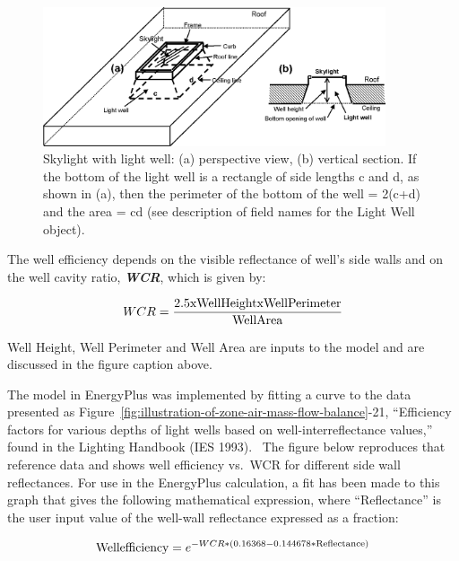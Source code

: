 \begin{figure}[hbtp] %
\centering
\includegraphics[width=0.9\textwidth, height=0.9\textheight, keepaspectratio=true]{media/image907.png}
\caption{Skylight with light well: (a) perspective view, (b) vertical section. If the bottom of the light well is a rectangle of side lengths c and d, as shown in (a), then the perimeter of the bottom of the well = 2(c+d) and the area = cd (see description of field names for the Light Well object). \protect \label{fig:skylight-with-light-well-a-perspective-view-b}}
\end{figure}

The well efficiency depends on the visible reflectance of well's side walls and on the well cavity ratio, \textbf{\emph{WCR}}, which is given by:

\begin{equation}
WCR = \frac{{{\rm{2}}{\rm{.5 x Well Height x Well Perimeter}}}}{{{\rm{Well Area}}}}
\end{equation}

Well Height, Well Perimeter and Well Area are inputs to the model and are discussed in the figure caption above.

The model in EnergyPlus was implemented by fitting a curve to the data presented as Figure~\ref{fig:illustration-of-zone-air-mass-flow-balance}-21, ``Efficiency factors for various depths of light wells based on well-interreflectance values,'' found in the Lighting Handbook (IES 1993).~ The figure below reproduces that reference data and shows well efficiency vs.~WCR for different side wall reflectances. For use in the EnergyPlus calculation, a fit has been made to this graph that gives the following mathematical expression, where ``Reflectance'' is the user input value of the well-wall reflectance expressed as a fraction:

\begin{equation}
{\rm{Well efficiency}} = {e^{ - WCR*(0.16368 - 0.144678*{\rm{Reflectance}})}}
\end{equation}


